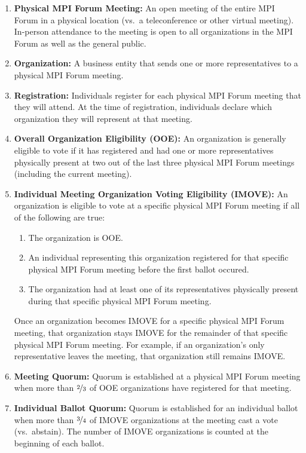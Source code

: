 \begin{enumerate}
\item {\bf Physical MPI Forum Meeting:} An open meeting of the entire
  MPI Forum in a physical location (vs.\ a teleconference or other
  virtual meeting).  In-person attendance to the meeting is open to
  all organizations in the MPI Forum as well as the general public.

\item {\bf Organization:} A business entity that sends one or more
  representatives to a physical MPI Forum meeting.

\item {\bf Registration:} Individuals register for each physical MPI
  Forum meeting that they will attend.  At the time of registration,
  individuals declare which organization they will represent at that
  meeting.

\item {\bf Overall Organization Eligibility (OOE):} An organization is
  generally eligible to vote if it has registered and had one or more
  representatives physically present at two out of the last three
  physical MPI Forum meetings (including the current meeting).

\item {\bf Individual Meeting Organization Voting Eligibility
    (IMOVE):} An organization is eligible to vote at a specific
  physical MPI Forum meeting if all of the following are true:
  \begin{enumerate}
  \item The organization is OOE.
  \item An individual representing this organization registered for
    that specific physical MPI Forum meeting before the first ballot
    occured.
  \item The organization had at least one of its representatives
    physically present during that specific physical MPI
    Forum meeting.
  \end{enumerate}
  Once an organization becomes IMOVE for a specific physical MPI Forum
  meeting, that organization stays IMOVE for the remainder of that
  specific physical MPI Forum meeting.  For example, if an
  organization's only representative leaves the meeting, that
  organization still remains IMOVE.

\item {\bf Meeting Quorum:} Quorum is established at a physical MPI
  Forum meeting when more than $\nicefrac{2}{3}$ of OOE organizations
  have registered for that meeting.

\item {\bf Individual Ballot Quorum:} Quorum is established for an
  individual ballot when more than $\nicefrac{3}{4}$ of IMOVE
  organizations at the meeting cast a vote (vs.\ abstain).  The number
  of IMOVE organizations is counted at the beginning of each ballot.
\end{enumerate}

